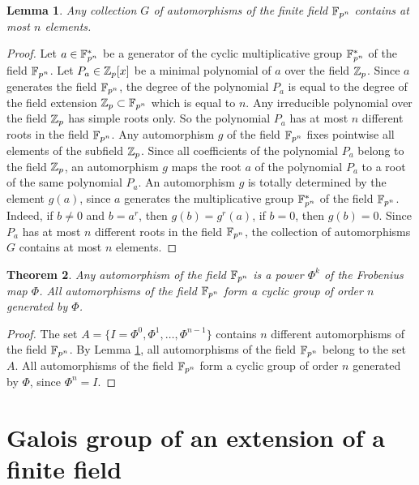 \documentclass[11pt]{article}
\theoremstyle{plain}
\newtheorem{theorem}{Theorem}[section]
\newtheorem{lemma}[theorem]{Lemma}
\theoremstyle{definition}
\begin{document}
\begin{lemma}\label{bound} Any collection $G$ of automorphisms  of the finite field $\Bbb F_{p^n}$ contains at most $n$ elements.
\end{lemma}

\begin{proof} Let $a\in \Bbb F^*_{p^n}$  be a generator of the cyclic multiplicative group $\Bbb F^*_{p^n}$ of the field $\Bbb F_{p^n}$. Let $P_a\in \Bbb Z_p[x]$ be a minimal polynomial of $a$ over the field $\Bbb Z_p$. Since $a$ generates  the field  $\Bbb F_{p^n}$, the degree of the polynomial $P_a$ is equal to the degree of the field extension $\Bbb Z_p\subset \Bbb F_{p^n}$ which is equal to $n$. Any irreducible polynomial over the field  $\Bbb Z_p$ has simple roots only.  So the polynomial $P_a$ has at most $n$ different roots in the field $\Bbb F_{p^n}$. Any automorphism $g$ of the field $\Bbb F_{p^n}$ fixes pointwise all elements of the subfield $\Bbb Z_p$. Since all coefficients of the polynomial  $P_a$ belong to the field $\Bbb Z_p$, an automorphism $g$ maps the root $a$ of the polynomial $P_a$ to a root  of the same polynomial $P_a$. An automorphism $g$ is totally determined by the element $g(a)$,  since $a$ generates the multiplicative group  $\Bbb F^*_{p^n}$ of the field $\Bbb F_{p^n}$. Indeed,  if  $b\neq 0$ and $b=a^r$, then $g(b)=g^r(a)$, if $b=0$, then $g(b)=0$.
Since $P_a$ has at most $n$ different  roots in the field $\Bbb F_{p^n}$,  the collection of automorphisms  $G$  contains at most $n$ elements.
\end{proof}

\begin{theorem}\label{allauto} Any automorphism of the field $\Bbb F_{p^n}$  is a power $\Phi^k$ of the Frobenius map $\Phi$. All automorphisms of the field $\Bbb F_{p^n}$ form a cyclic group of order $n$ generated by $\Phi$.
\end{theorem}

\begin{proof} The set $A= \{I=\Phi^0, \Phi^1,\dots, \Phi^{n-1}\}$ contains  $n$ different automorphisms of the field $\Bbb F_{p^n}$. By Lemma \ref{bound}, all automorphisms of the field $\Bbb F_{p^n}$ belong to the set $A$. All automorphisms of  the field $\Bbb F_{p^n}$ form a cyclic group of order $n$ generated by $\Phi$, since $\Phi^n=I$.
\end{proof}

\section{Galois group of an extension of a finite field}\label{six}
\end{document}
